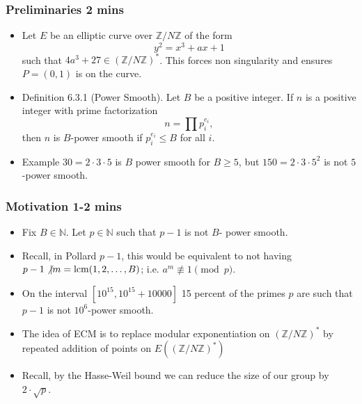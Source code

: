 \documentclass{beamer}
\begin{document}
\begin{frame}
\frametitle{Preliminaries 2 mins} 
\begin{itemize}
\item Let $E$ be an elliptic curve over $\mathbb{Z}/N\mathbb{Z}$ of the form
$$
	y^2 = x^3 + ax + 1
$$
such that $4a^3 + 27 \in \left(\mathbb{Z}/N\mathbb{Z}\right)^*$. This forces non singularity and ensures $P = (0,1)$ is on the curve.

\item Definition 6.3.1 (Power Smooth). Let $B$ be a positive integer. If $n$ is a positive integer with prime factorization 
$$
    n = \prod p_i^{e_i},
$$
then $n$ is $B$-power smooth if $p_i^{e_i} \leq B$ for all $i$. 

\item Example $30 = 2\cdot 3\cdot 5$ is $B$ power smooth for $B \geq 5$, but $150 = 2\cdot 3 \cdot 5^2$ is not $5$-power smooth.
\end{itemize}
\end{frame}

\begin{frame}
\frametitle{Motivation 1-2 mins}
\begin{itemize}
\item Fix $B \in \mathbb{N}$. Let $p \in \mathbb{N}$ such that $p-1$ is not $B$- power smooth. 

\item Recall, in Pollard $p-1$, this would be equivalent to not having $p-1 \not \vert m = \text{lcm}(1,2, \ldots, B)$; i.e. $a^m \not \equiv 1 \pmod{p}$.

\item On the interval $[10^{15}, 10^{15} + 10000]$ 15 percent of the primes $p$ are such that $p-1$ is not $10^{6}$-power smooth. 

\item The idea of ECM is to replace modular exponentiation on $\left(\mathbb{Z}/N\mathbb{Z}\right)^*$ by repeated addition of points on $E\left(\left(\mathbb{Z}/N\mathbb{Z}\right)^*\right)$

\item Recall, by the Hasse-Weil bound we can reduce the size of our group by $2\cdot \sqrt{p}$. 
\end{itemize}
\end{frame}
\end{document}
